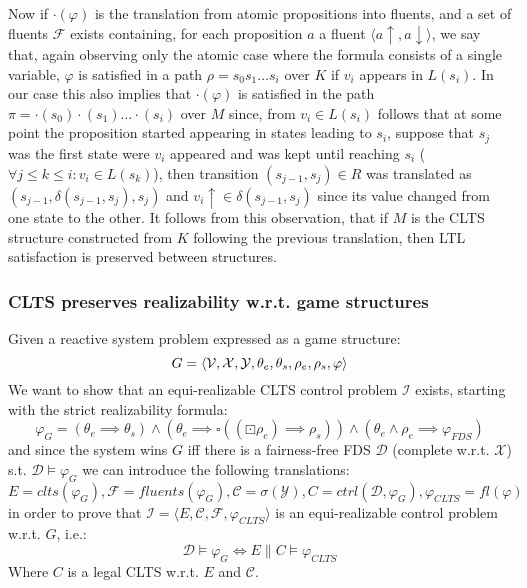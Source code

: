 Now if $\cdot(\varphi)$ is the translation from atomic propositions into fluents, and a set of fluents $\mathcal{F}$ exists containing, for each proposition $a$ a fluent $\langle a\uparrow, a\downarrow \rangle$, we say that, again observing only the atomic case where the formula consists of a single variable, $\varphi$ is satisfied in a path $\rho=s_0 s_1\ldots s_i$ over $K$ if $v_i$ appears in $L(s_i)$. In our case this also implies that $\cdot(\varphi)$ is satisfied in the path $\pi=\cdot(s_0)\cdot(s_1)\ldots \cdot(s_i)$ over $M$ since, from $v_i \in L(s_i)$ follows that at some point the proposition started appearing in states leading to $s_i$, suppose that $s_j$ was the first state were $v_i$ appeared and was kept until reaching $s_i$ ($\forall j \leq k \leq i: v_i \in L(s_k)$), then transition $(s_{j-1},s_j) \in R$ was translated as $(s_{j-1}, \delta(s_{j-1},s_j),s_j)$ and $v_i\uparrow \in \delta(s_{j-1},s_j)$ since its value changed from one state to the other. It follows from this observation, that if $M$ is the CLTS structure constructed from $K$ following the previous translation, then LTL satisfaction is preserved between structures.


\subsubsection{CLTS preserves realizability w.r.t. game structures}
Given a reactive system problem expressed as a game structure:
\[G = \langle {\mathcal{V}}, {\mathcal{X}}, {\mathcal{Y}}, {\theta_e}, {\theta_s}, {\rho_e}, {\rho_s}, \varphi \rangle\]
We want to show that an equi-realizable CLTS control problem $\mathcal{I}$  exists, starting with the strict realizability formula:
\[\varphi_G = (\theta_e \implies \theta_s) \wedge (\theta_e \implies \square((\boxdot \rho_e) \implies \rho_s)) \wedge (\theta_e \wedge \rho_e \implies \varphi_{FDS}) \]
and since the system wins $G$ iff there is a fairness-free FDS $\mathcal{D}$ (complete w.r.t. $\mathcal{X}$) s.t. $\mathcal{D} \models \varphi_G$ we can introduce the following translations:
\[E = clts(\varphi_G),\mathcal{F} = fluents(\varphi_G),\mathcal{C} = \sigma(\mathcal{Y}),C= ctrl(\mathcal{D},\varphi_G),\varphi_{CLTS} = fl(\varphi)\]
in order to prove that $\mathcal{I} = \langle E, \mathcal{C}, \mathcal{F}, \varphi_{CLTS} \rangle$ is an equi-realizable control problem w.r.t. $G$, i.e.: 
\[\mathcal{D}\models \varphi_G \iff E \parallel C \models \varphi_{CLTS}\]
Where $C$ is a legal CLTS w.r.t. $E$ and $\mathcal{C}$.

